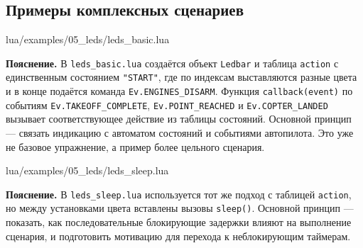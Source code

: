 \subsection{Примеры комплексных сценариев}
\begin{codefile}{lua/examples/05_leds/leds_basic.lua}
\end{codefile}
\textbf{Пояснение.} В \verb|leds_basic.lua| создаётся объект \verb|Ledbar| и таблица \verb|action| с единственным состоянием \verb|"START"|, где по индексам выставляются разные цвета и в конце подаётся команда \verb|Ev.ENGINES_DISARM|. Функция \verb|callback(event)| по событиям \verb|Ev.TAKEOFF_COMPLETE|, \verb|Ev.POINT_REACHED| и \verb|Ev.COPTER_LANDED| вызывает соответствующее действие из таблицы состояний. Основной принцип --- связать индикацию с автоматом состояний и событиями автопилота. Это уже не базовое упражнение, а пример более цельного сценария.

\begin{codefile}{lua/examples/05_leds/leds_sleep.lua}
\end{codefile}
\textbf{Пояснение.} В \verb|leds_sleep.lua| используется тот же подход с таблицей \verb|action|, но между установками цвета вставлены вызовы \verb|sleep()|. Основной принцип --- показать, как последовательные блокирующие задержки влияют на выполнение сценария, и подготовить мотивацию для перехода к неблокирующим таймерам.
